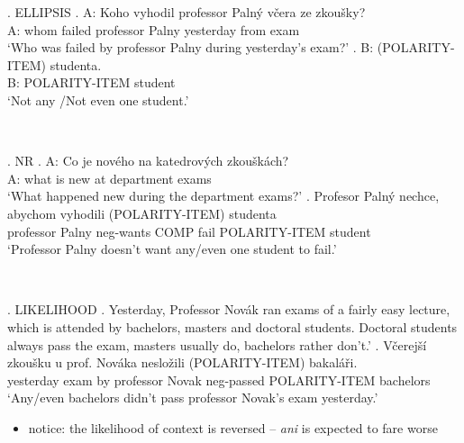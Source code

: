 \documentclass[
  ignorenonframetext,
]{beamer}
\providecommand{\tightlist}{%
  \setlength{\itemsep}{0pt}\setlength{\parskip}{0pt}}\usepackage{longtable,booktabs,array}
\newcommand{\cond}[1]{\textsc{#1}}
\begin{document}
\begin{frame}
\ex. \cond{ELLIPSIS} \ag. A: Koho vyhodil professor Palný včera ze
zkoušky?\\
A: whom failed professor Palny yesterday from exam\\
`Who was failed by professor Palny during yesterday's exam?' \bg. B:
(POLARITY-ITEM) studenta.\\
B: POLARITY-ITEM student\\
`Not any /Not even one student.'

~
\end{frame}

\begin{frame}
\ex. \cond{NR} \ag. A: Co je nového na katedrových zkouškách?\\
A: what is new at department exams\\
`What happened new during the department exams?' \bg. Profesor Palný
nechce, abychom vyhodili (POLARITY-ITEM) studenta\\
professor Palny neg-wants COMP fail POLARITY-ITEM student\\
`Professor Palny doesn't want any/even one student to fail.'

~
\end{frame}

\begin{frame}
\ex. \cond{LIKELIHOOD} \a. Yesterday, Professor Novák ran exams of a
fairly easy lecture, which is attended by bachelors, masters and
doctoral students. Doctoral students always pass the exam, masters
usually do, bachelors rather don't.' \bg. Včerejší zkoušku u prof.
Nováka nesložili (POLARITY-ITEM) bakaláři.\\
yesterday exam by professor Novak neg-passed POLARITY-ITEM bachelors\\
`Any/even bachelors didn't pass professor Novak's exam yesterday.'

\begin{itemize}
\tightlist
\item
  notice: the likelihood of context is reversed -- \emph{ani} is
  expected to fare worse
\end{itemize}
\end{frame}
\end{document}
